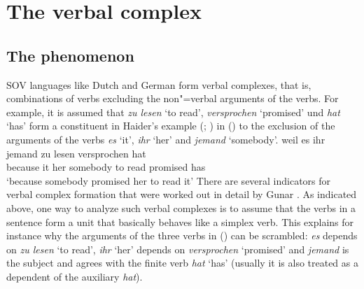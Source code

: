 
\chapter{The verbal complex}
\label{chap-verbal-complex}


\section{The phenomenon}

SOV languages like Dutch and German form verbal complexes, that is, combinations of verbs excluding
the non"=verbal arguments of the verbs. For example, it is assumed that \emph{zu lesen} `to read',
\emph{versprochen} `promised' und \emph{hat} `has' form a constituent in Haider's example (\citeyear[]{Haider86c}; \citeyear[]{Haider90b}) in () to the exclusion of the arguments of the verbs
\emph{es} `it', \emph{ihr} `her' and \emph{jemand} `somebody'.
\ea\label{ex-weil-es-ihr-jemand-zu-lesen-versprochen-hat}
\gll weil es ihr jemand zu lesen versprochen hat\\
     because it her somebody to read promised has\\
\glt `because somebody promised her to read it'
\z
There are several indicators for verbal complex formation
that were worked out in detail by Gunar \citet{Bech55a}. As indicated above, one way to analyze such verbal
complexes is to assume that the verbs in a sentence form a unit that basically behaves like a
simplex verb. This explains for instance why the arguments of the three verbs in () can be scrambled:
\emph{es} depends on \emph{zu lesen} `to read', \emph{ihr} `her' depends on \emph{versprochen}
`promised' and \emph{jemand} is the subject and agrees with the finite verb \emph{hat} `has'
(usually it is also treated as a dependent of the auxiliary \emph{hat}).

